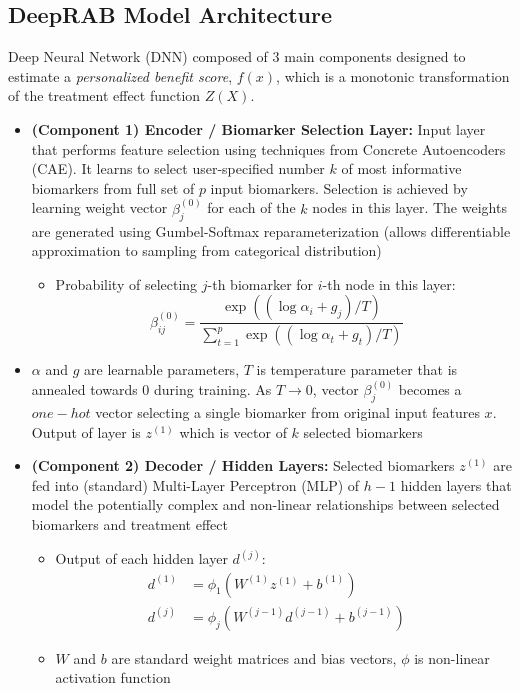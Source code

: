 \documentclass[../main.tex]{subfiles}
\begin{document}
\subsection*{DeepRAB Model Architecture}

Deep Neural Network (DNN) composed of $3$ main components designed to estimate a \textit{personalized benefit score}, $f(x)$, which is a monotonic transformation of the treatment effect function $Z(X)$.

\begin{itemize}
    \item \textbf{(Component 1) Encoder / Biomarker Selection Layer:} Input layer that performs feature selection using techniques from Concrete Autoencoders (CAE). It learns to select user-specified number $k$ of most informative biomarkers from full set of $p$ input biomarkers. Selection is achieved by learning weight vector $\beta_j^{(0)}$ for each of the $k$ nodes in this layer. The weights are generated using Gumbel-Softmax reparameterization (allows differentiable approximation to sampling from categorical distribution)
    \begin{itemize}
        \item Probability of selecting $j$-th biomarker for $i$-th node in this layer:
        \[
        \beta_{ij}^{(0)} = \frac{\exp((\log \alpha_i + g_j)/T)}{\sum_{t=1}^{p} \exp((\log \alpha_t + g_t)/T)} \quad
        \]
    \end{itemize}
    \item $\alpha$ and $g$ are learnable parameters, $T$ is temperature parameter that is annealed towards 0 during training. As $T \rightarrow 0$, vector $\beta_j^{(0)}$ becomes a $one-hot$ vector selecting a single biomarker from original input features $x$. Output of layer is $z^{(1)}$ which is vector of $k$ selected biomarkers

    \item \textbf{(Component 2) Decoder / Hidden Layers:} Selected biomarkers $z^{(1)}$ are fed into (standard) Multi-Layer Perceptron (MLP) of $h-1$ hidden layers that model the potentially complex and non-linear relationships between selected biomarkers and treatment effect
    \begin{itemize}
        \item Output of each hidden layer $d^{(j)}$:
        \begin{align*}
        d^{(1)} &= \phi_1(W^{(1)} z^{(1)} + b^{(1)}) \\
        d^{(j)} &= \phi_j(W^{(j-1)} d^{(j-1)} + b^{(j-1)}) \quad
        \end{align*}
        \item $W$ and $b$ are standard weight matrices and bias vectors, $\phi$ is non-linear activation function
    \end{itemize}


\end{itemize}
\end{document}
